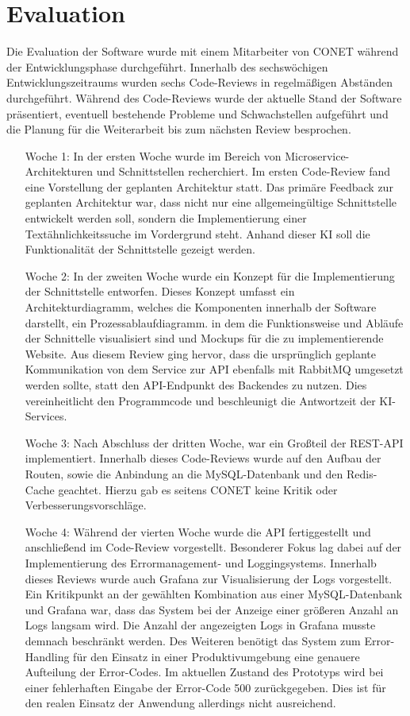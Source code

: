 \section{Evaluation}
Die Evaluation der Software wurde mit einem Mitarbeiter von CONET während der Entwicklungsphase durchgeführt. Innerhalb des sechswöchigen Entwicklungszeitraums wurden sechs Code-Reviews in regelmäßigen Abständen durchgeführt. Während des Code-Reviews wurde der aktuelle Stand der Software präsentiert, eventuell bestehende Probleme und Schwachstellen aufgeführt und die Planung für die Weiterarbeit bis zum nächsten Review besprochen.

\begin{itemize}[leftmargin=6em]
\item [Woche 1:] In der ersten Woche wurde im Bereich von Microservice-Architekturen und Schnittstellen recherchiert. Im ersten Code-Review fand eine Vorstellung der geplanten Architektur statt. Das primäre Feedback zur geplanten Architektur war, dass nicht nur eine allgemeingültige Schnittstelle entwickelt werden soll, sondern die Implementierung einer Textähnlichkeitssuche im Vordergrund steht. Anhand dieser KI soll die Funktionalität der Schnittstelle gezeigt werden.
\item [Woche 2:] In der zweiten Woche wurde ein Konzept für die Implementierung der Schnittstelle entworfen. Dieses Konzept umfasst ein Architekturdiagramm, welches die Komponenten innerhalb der Software darstellt, ein Prozessablaufdiagramm. in dem die Funktionsweise und Abläufe der Schnittelle visualisiert sind und Mockups für die zu implementierende Website. Aus diesem Review ging hervor, dass die ursprünglich geplante Kommunikation von dem Service zur API ebenfalls mit RabbitMQ umgesetzt werden sollte, statt den API-Endpunkt des Backendes zu nutzen. Dies vereinheitlicht den Programmcode und beschleunigt die Antwortzeit der KI-Services.
\item [Woche 3:] Nach Abschluss der dritten Woche, war ein Großteil der REST-API implementiert. Innerhalb dieses Code-Reviews wurde auf den Aufbau der Routen, sowie die Anbindung an die MySQL-Datenbank und den Redis-Cache geachtet. Hierzu gab es seitens CONET keine Kritik oder Verbesserungsvorschläge.
\item [Woche 4:] Während der vierten Woche wurde die API fertiggestellt und anschließend im Code-Review vorgestellt. Besonderer Fokus lag dabei auf der Implementierung des Errormanagement- und Loggingsystems. Innerhalb dieses Reviews wurde auch Grafana zur Visualisierung der Logs vorgestellt. Ein Kritikpunkt an der gewählten Kombination aus einer MySQL-Datenbank und Grafana war, dass das System bei der Anzeige einer größeren Anzahl an Logs langsam wird. Die Anzahl der angezeigten Logs in Grafana musste demnach beschränkt werden. Des Weiteren benötigt das System zum Error-Handling für den Einsatz in einer Produktivumgebung eine genauere Aufteilung der Error-Codes. Im aktuellen Zustand des Prototyps wird bei einer fehlerhaften Eingabe der Error-Code 500 zurückgegeben. Dies ist für den realen Einsatz der Anwendung allerdings nicht ausreichend.

\end{itemize}
